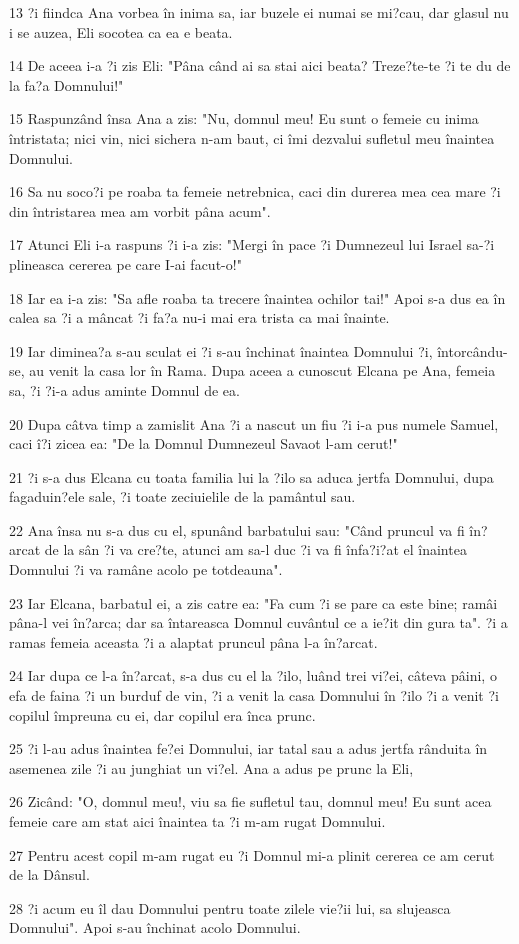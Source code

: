 \par 13 ?i fiindca Ana vorbea în inima sa, iar buzele ei numai se mi?cau, dar glasul nu i se auzea, Eli socotea ca ea e beata.
\par 14 De aceea i-a ?i zis Eli: "Pâna când ai sa stai aici beata? Treze?te-te ?i te du de la fa?a Domnului!"
\par 15 Raspunzând însa Ana a zis: "Nu, domnul meu! Eu sunt o femeie cu inima întristata; nici vin, nici sichera n-am baut, ci îmi dezvalui sufletul meu înaintea Domnului.
\par 16 Sa nu soco?i pe roaba ta femeie netrebnica, caci din durerea mea cea mare ?i din întristarea mea am vorbit pâna acum".
\par 17 Atunci Eli i-a raspuns ?i i-a zis: "Mergi în pace ?i Dumnezeul lui Israel sa-?i plineasca cererea pe care I-ai facut-o!"
\par 18 Iar ea i-a zis: "Sa afle roaba ta trecere înaintea ochilor tai!" Apoi s-a dus ea în calea sa ?i a mâncat ?i fa?a nu-i mai era trista ca mai înainte.
\par 19 Iar diminea?a s-au sculat ei ?i s-au închinat înaintea Domnului ?i, întorcându-se, au venit la casa lor în Rama. Dupa aceea a cunoscut Elcana pe Ana, femeia sa, ?i ?i-a adus aminte Domnul de ea.
\par 20 Dupa câtva timp a zamislit Ana ?i a nascut un fiu ?i i-a pus numele Samuel, caci î?i zicea ea: "De la Domnul Dumnezeul Savaot l-am cerut!"
\par 21 ?i s-a dus Elcana cu toata familia lui la ?ilo sa aduca jertfa Domnului, dupa fagaduin?ele sale, ?i toate zeciuielile de la pamântul sau.
\par 22 Ana însa nu s-a dus cu el, spunând barbatului sau: "Când pruncul va fi în?arcat de la sân ?i va cre?te, atunci am sa-l duc ?i va fi înfa?i?at el înaintea Domnului ?i va ramâne acolo pe totdeauna".
\par 23 Iar Elcana, barbatul ei, a zis catre ea: "Fa cum ?i se pare ca este bine; ramâi pâna-l vei în?arca; dar sa întareasca Domnul cuvântul ce a ie?it din gura ta". ?i a ramas femeia aceasta ?i a alaptat pruncul pâna l-a în?arcat.
\par 24 Iar dupa ce l-a în?arcat, s-a dus cu el la ?ilo, luând trei vi?ei, câteva pâini, o efa de faina ?i un burduf de vin, ?i a venit la casa Domnului în ?ilo ?i a venit ?i copilul împreuna cu ei, dar copilul era înca prunc.
\par 25 ?i l-au adus înaintea fe?ei Domnului, iar tatal sau a adus jertfa rânduita în asemenea zile ?i au junghiat un vi?el. Ana a adus pe prunc la Eli,
\par 26 Zicând: "O, domnul meu!, viu sa fie sufletul tau, domnul meu! Eu sunt acea femeie care am stat aici înaintea ta ?i m-am rugat Domnului.
\par 27 Pentru acest copil m-am rugat eu ?i Domnul mi-a plinit cererea ce am cerut de la Dânsul.
\par 28 ?i acum eu îl dau Domnului pentru toate zilele vie?ii lui, sa slujeasca Domnului". Apoi s-au închinat acolo Domnului.

